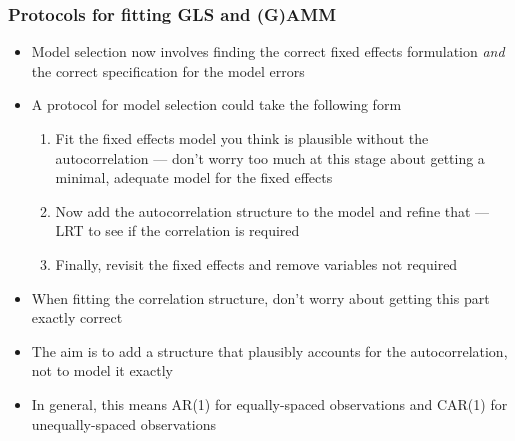 \documentclass{beamer}
\begin{document}


\begin{frame}
    \frametitle{Protocols for fitting GLS and (G)AMM}
    \begin{itemize}
        \item Model selection now involves finding the correct fixed effects formulation \textit{and} the correct specification for the model errors
        \item A protocol for model selection could take the following form
        \begin{enumerate}
            \item Fit the fixed effects model you think is plausible without the autocorrelation --- don't worry too much at this stage about getting a minimal, adequate model for the fixed effects
            \item Now add the autocorrelation structure to the model and refine that --- LRT to see if the correlation is required
            \item Finally, revisit the fixed effects and remove variables not required
        \end{enumerate}
        \item When fitting the correlation structure, don't worry about getting this part exactly correct
        \item The aim is to add a structure that plausibly accounts for the autocorrelation, not to model it exactly
        \item In general, this means AR(1) for equally-spaced observations and CAR(1) for unequally-spaced observations
    \end{itemize}
\end{frame}
\end{document}
